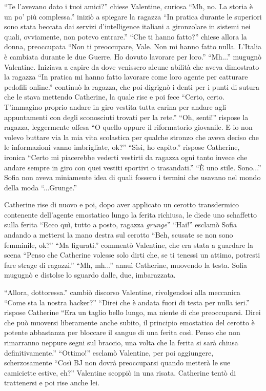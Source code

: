     ``Te l'avevano dato i tuoi amici?'' chiese Valentine, curiosa ``Mh, no. La storia è un po' più complessa.'' iniziò
    a spiegare la ragazza ``In pratica durante le superiori sono stata beccata dai servizi d'intelligence italiani a
    gironzolare in sistemi nei quali, ovviamente, non potevo entrare.'' ``Che ti hanno fatto?'' chiese allora la donna,
    preoccupata ``Non ti preoccupare, Vale. Non mi hanno fatto nulla. L'Italia è cambiata durante le due Guerre. Ho
    dovuto lavorare per loro.'' ``Mh...'' mugugnò Valentine. Iniziava a capire da dove venissero alcune abilità che aveva dimostrato la
    ragazza ``In pratica mi hanno fatto lavorare come loro agente per catturare pedofili online.'' continuò la ragazza,
    che poi digrignò i denti per i punti di sutura che le stava mettendo Catherine, la quale rise e poi fece ``Certo,
    certo. T'immagino proprio andare in giro vestita tutta carina per andare agli appuntamenti con degli sconosciuti
    trovati per la rete.'' ``Oh, senti!'' rispose la ragazza, leggermente offesa ``O quello oppure il riformatorio
    giovanile. E io non volevo buttare via la mia vita scolastica per qualche stronzo che aveva deciso che le
    informazioni vanno imbrigliate, ok?'' ``Sìsì, ho capito.'' rispose Catherine, ironica ``Certo mi piacerebbe vederti
    vestirti da ragazza ogni tanto invece che andare sempre in giro con quei vestiti sportivi o trasandati.'' ``È uno stile.
    Sono...'' Sofia non aveva miniamente idea di quali fossero i termini che usavano nel mondo della moda ``...Grunge.''

    Catherine rise di nuovo e poi, dopo aver applicato un cerotto transdermico contenente dell'agente emostatico lungo
    la ferita richiusa, le diede uno schaffetto sulla ferita ``Ecco quì, tutto a posto, ragazza \emph{grunge}'' ``Hai!''
    esclamò Sofia andando a mettersi la mano destra sul cerotto ``Beh, scusate se non sono femminile, ok?'' ``Ma
    figurati.'' commentò Valentine, che era stata a guardare la scena ``Penso che Catherine volesse solo dirti che, se
    ti tenessi un attimo, potresti fare strage di ragazzi.'' ``Mh, mh...'' annuì Catherine, muovendo la testa. Sofia
    mugugnò e distolse lo sguardo dalle, due, imbarazzata.

    ``Allora, dottoressa.'' cambiò discorso Valentine, rivolgendosi alla meccanica ``Come sta la nostra hacker?''
    ``Direi che è andata fuori di testa per nulla ieri.'' rispose Catherine ``Era un taglio bello lungo, ma niente di
    che preoccuparsi. Direi che può muoversi liberamente anche subito, il principio emostatico del cerotto è potente
    abbastanza per bloccare il sangue di una ferita così. Penso che non rimarranno neppure segni sul braccio, una volta
    che la ferita si sarà chiusa definitivamente.'' ``Ottimo!'' esclamò Valentine, per poi aggiungere, scherzosamente
    ``Così BJ non dovrà preoccuparsi quando metterà le sue camiciette estive, eh?'' Valentine scoppiò in una risata.
    Catherine tentò di trattenersi e poi rise anche lei.

